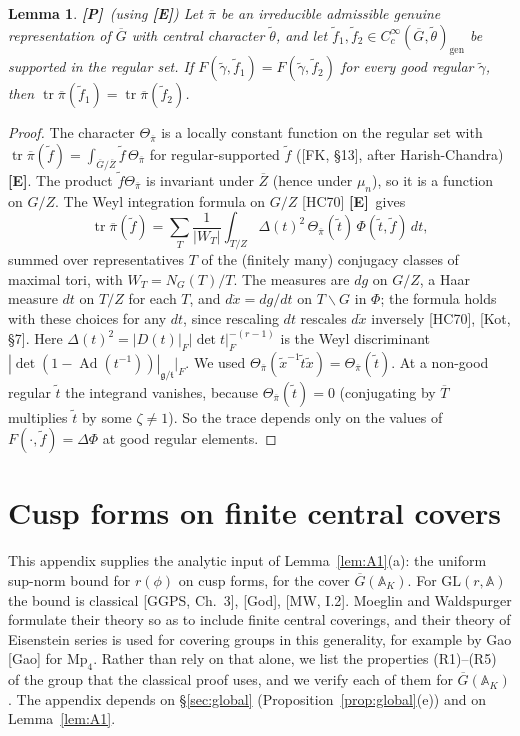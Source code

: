 \documentclass[12pt]{article}
\newcommand{\ov}[1]{\overline{#1}}
\newcommand{\A}{\mathbb{A}}
\newcommand{\gen}{\mathrm{gen}}
\newcommand{\tr}{\operatorname{tr}}
\newcommand{\Ad}{\operatorname{Ad}}
\newcommand{\GL}{\mathrm{GL}}
\newcommand{\Gb}{\ov{G}}
\newcommand{\Zb}{\ov{Z}}
\newcommand{\pib}{\ov{\pi}}
\newcommand{\Tb}{\ov{T}}
\newcommand{\Pv}{\textbf{[P]}}
\newcommand{\Ev}{\textbf{[E]}}
\theoremstyle{plain}
\newtheorem{lemma}[theorem]{Lemma}
\theoremstyle{definition}
\begin{document}
\begin{lemma}\label{lem:traceOI}\Pv\ (using \Ev)
Let $\pib$ be an irreducible admissible genuine representation of $\Gb$ with central character $\tilde\theta$, and let $\tilde f_1,\tilde f_2\in C_c^\infty(\Gb,\tilde\theta)_\gen$ be supported in the regular set. If $F(\tilde\gamma,\tilde f_1)=F(\tilde\gamma,\tilde f_2)$ for every good regular $\tilde\gamma$, then $\tr\pib(\tilde f_1)=\tr\pib(\tilde f_2)$.
\end{lemma}
\begin{proof}
The character $\Theta_{\pib}$ is a locally constant function on the regular set with $\tr\pib(\tilde f)=\int_{\Gb/\Zb}\tilde f\,\Theta_{\pib}$ for regular-supported $\tilde f$ ([FK, \S13], after Harish-Chandra) \Ev. The product $\tilde f\Theta_{\pib}$ is invariant under $\Zb$ (hence under $\mu_n$), so it is a function on $G/Z$. The Weyl integration formula on $G/Z$ [HC70] \Ev\ gives
\[ \tr\pib(\tilde f)=\sum_{T}\frac1{|W_T|}\int_{T/Z}\Delta(t)^2\,\Theta_{\pib}(\tilde t)\,\Phi(\tilde t,\tilde f)\,dt, \]
summed over representatives $T$ of the (finitely many) conjugacy classes of maximal tori, with $W_T=N_G(T)/T$. The measures are $dg$ on $G/Z$, a Haar measure $dt$ on $T/Z$ for each $T$, and $d\dot x=dg/dt$ on $T\backslash G$ in $\Phi$; the formula holds with these choices for any $dt$, since rescaling $dt$ rescales $d\dot x$ inversely [HC70], [Kot, \S7]. Here $\Delta(t)^2=|D(t)|_F|\det t|_F^{-(r-1)}$ is the Weyl discriminant $|\det(1-\Ad(t^{-1}))|_{\mathfrak g/\mathfrak t}|_F$. We used $\Theta_{\pib}(\tilde x^{-1}\tilde t\tilde x)=\Theta_{\pib}(\tilde t)$. At a non-good regular $\tilde t$ the integrand vanishes, because $\Theta_{\pib}(\tilde t)=0$ (conjugating by $\Tb$ multiplies $\tilde t$ by some $\zeta\ne1$). So the trace depends only on the values of $F(\cdot,\tilde f)=\Delta\Phi$ at good regular elements.
\end{proof}


\section{Cusp forms on finite central covers}\label{app:cusp}
This appendix supplies the analytic input of Lemma~\ref{lem:A1}(a): the uniform sup-norm bound for $r(\phi)$ on cusp forms, for the cover $\Gb(\A_K)$. For $\GL(r,\A)$ the bound is classical [GGPS, Ch.~3], [God], [MW, I.2]. Moeglin and Waldspurger formulate their theory so as to include finite central coverings, and their theory of Eisenstein series is used for covering groups in this generality, for example by Gao [Gao] for $\mathrm{Mp}_4$. Rather than rely on that alone, we list the properties (R1)--(R5) of the group that the classical proof uses, and we verify each of them for $\Gb(\A_K)$. The appendix depends on \S\ref{sec:global} (Proposition~\ref{prop:global}(e)) and on Lemma~\ref{lem:A1}.
\end{document}
